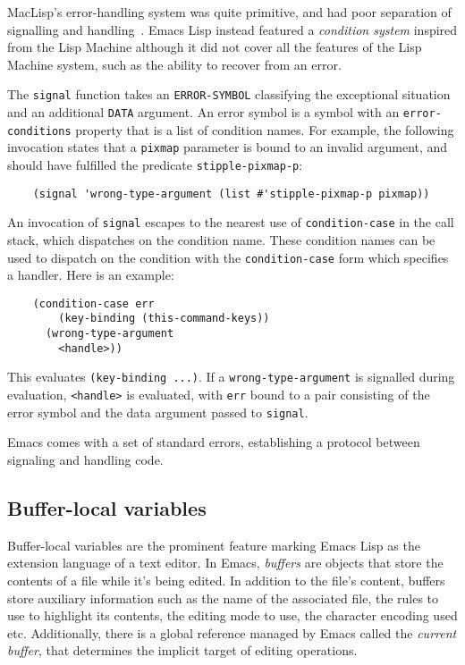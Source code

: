 \documentclass[format=acmsmall, review]{acmart}
\newcommand \Elisp {Emacs Lisp}
\begin{document}
MacLisp's error-handling system was quite primitive, and had poor separation
of signalling and handling~\cite{Pitman2001}.  \Elisp{} instead featured
a \emph{condition system} inspired from the Lisp Machine although it did
not cover all the features of the Lisp Machine system, such as the ability
to recover from an error.

The \texttt{signal} function takes an \texttt{ERROR-SYMBOL} classifying the
exceptional situation and an additional \texttt{DATA} argument.  An error
symbol is a symbol with an \texttt{error-conditions} property that is a list
of condition names.  For example, the following invocation states that
a \texttt{pixmap} parameter is bound to an invalid argument, and
should have fulfilled the predicate \texttt{stipple-pixmap-p}:
\begin{verbatim}
    (signal 'wrong-type-argument (list #'stipple-pixmap-p pixmap))
\end{verbatim}
An invocation of \texttt{signal} escapes to the nearest
use of \texttt{condition-case} in the call stack, which dispatches on the
condition name.
These condition names can be used to dispatch on the condition with
the \texttt{condition-case} form which specifies a handler.
Here is an example:
\begin{verbatim}
    (condition-case err
        (key-binding (this-command-keys))
      (wrong-type-argument
        <handle>))
\end{verbatim}
This evaluates \texttt{(key-binding ...)}.  If a
\texttt{wrong-type-argument} is signalled during evaluation,
\texttt{<handle>} is evaluated, with \texttt{err} bound to a pair
consisting of the error symbol and the data argument passed to
\texttt{signal}.

Emacs comes with a set of standard errors, establishing a protocol
between signaling and handling code.

\subsection{Buffer-local variables}
\label{sec:buffer-local-variables}

Buffer-local variables are the prominent feature marking \Elisp{} as the
extension language of a text editor.  In Emacs, \emph{buffers} are objects
that store the contents of a file while it's being edited.  In addition to
the file's content, buffers store auxiliary information such
as the name of the associated file, the rules to use to highlight its
contents, the editing mode to use, the character encoding used etc.
Additionally, there is a global reference managed by Emacs called the
\emph{current buffer}, that determines the implicit target of
editing operations.
\end{document}
